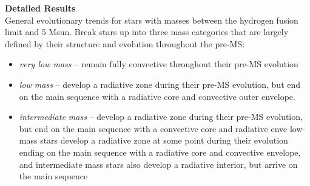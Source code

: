 \textbf{Detailed Results} \\
General evolutionary trends for stars with masses between the hydrogen fusion limit and 5 Msun. Break stars up into three mass categories that are largely defined by their structure and evolution throughout the pre-MS: 
\begin{itemize}
 \item[] {\it very low mass} -- remain fully convective throughout their pre-MS evolution
 \item[] {\it low mass} -- develop a radiative zone during their pre-MS evolution, but end on the main sequence with a radiative core and convective outer envelope.
 \item[] {\it intermediate mass} -- develop a radiative zone during their pre-MS evolution, but end on the main sequence with a convective core and radiative enve
low-mass stars develop a radiative zone at some point during their evolution ending on the main sequence with a radiative core and convective envelope, and intermediate mass stars also develop a radiative interior, but arrive on the main sequence
\end{itemize}